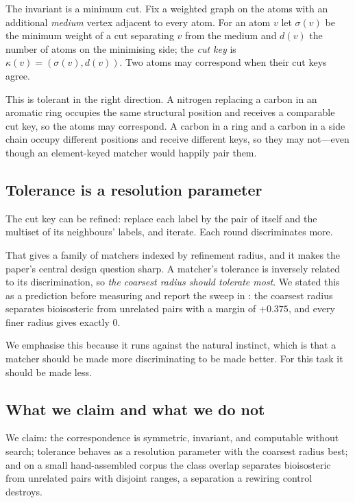 \documentclass[11pt,twocolumn,a4paper]{article}
\theoremstyle{scthm}
\theoremstyle{definition}
\theoremstyle{remark}
\newcommand{\sep}{\sigma}
\newcommand{\dep}{d}
\newcommand{\key}{\kappa}
\begin{document}
The invariant is a minimum cut. Fix a weighted graph on the atoms with an
additional \emph{medium} vertex adjacent to every atom. For an atom $v$
let $\sep(v)$ be the minimum weight of a cut separating $v$ from the
medium and $\dep(v)$ the number of atoms on the minimising side; the
\emph{cut key} is $\key(v)=(\sep(v),\dep(v))$. Two atoms may correspond
when their cut keys agree.

This is tolerant in the right direction. A nitrogen replacing a carbon in
an aromatic ring occupies the same structural position and receives a
comparable cut key, so the atoms may correspond. A carbon in a ring and a
carbon in a side chain occupy different positions and receive different
keys, so they may not---even though an element-keyed matcher would
happily pair them.

\subsection{Tolerance is a resolution parameter}

The cut key can be refined: replace each label by the pair of itself and
the multiset of its neighbours' labels, and iterate. Each round
discriminates more.

That gives a family of matchers indexed by refinement radius, and it makes
the paper's central design question sharp. A matcher's tolerance is
inversely related to its discrimination, so \emph{the coarsest radius
should tolerate most}. We stated this as a prediction before measuring and
report the sweep in : the coarsest radius separates
bioisosteric from unrelated pairs with a margin of $+0.375$, and every
finer radius gives exactly $0$.

We emphasise this because it runs against the natural instinct, which is
that a matcher should be made more discriminating to be made better. For
this task it should be made less.

\subsection{What we claim and what we do not}

We claim: the correspondence is symmetric, invariant, and computable
without search; tolerance behaves as a resolution parameter with the
coarsest radius best; and on a small hand-assembled corpus the class
overlap separates bioisosteric from unrelated pairs with disjoint ranges,
a separation a rewiring control destroys.
\end{document}
